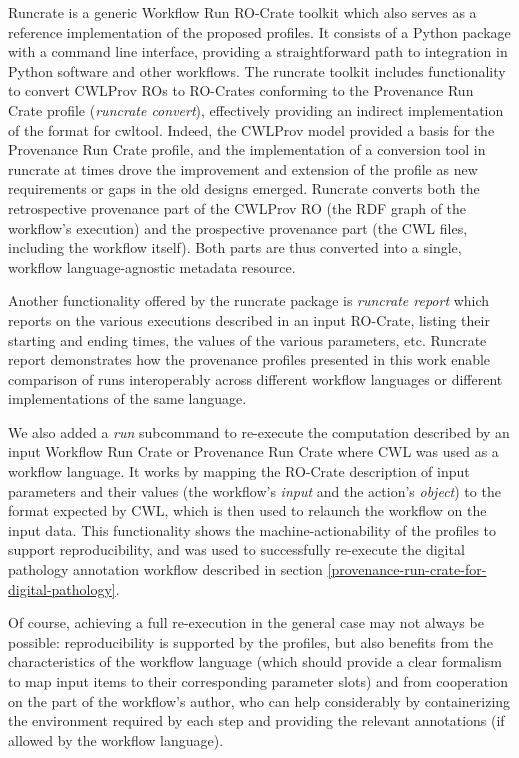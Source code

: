 \documentclass[10pt,letterpaper]{article}
\begin{document}
Runcrate \cite{runcrate} is a generic Workflow Run RO-Crate toolkit which also serves as a reference implementation of the proposed profiles.
It consists of a Python package with a command line interface, providing a straightforward path to integration in Python software and other workflows.
The runcrate toolkit includes functionality to convert CWLProv ROs to RO-Crates conforming to the Provenance Run Crate profile (\emph{runcrate convert}), effectively providing an indirect implementation of the format for cwltool.
Indeed, the CWLProv model provided a basis for the Provenance Run Crate profile, and the implementation of a conversion tool in runcrate at times drove the improvement and extension of the profile as new requirements or gaps in the old designs emerged.
Runcrate converts both the retrospective provenance part of the CWLProv RO (the RDF graph of the workflow's execution) and the prospective provenance part (the CWL files, including the workflow itself).
Both parts are thus converted into a single, workflow language-agnostic metadata resource.

Another functionality offered by the runcrate package is \emph{runcrate report} which reports on the various executions described in an input RO-Crate, listing their starting and ending times, the values of the various parameters, etc.
Runcrate report demonstrates how the provenance profiles presented in this work enable comparison of runs interoperably across different workflow languages or different implementations of the same language.

We also added a \emph{run} subcommand to re-execute the computation described by an input Workflow Run Crate or Provenance Run Crate where CWL was used as a workflow language.
It works by mapping the RO-Crate description of input parameters and their values (the workflow's
\emph{input} and the action's \emph{object}) to the format expected by CWL, which is then used to relaunch the workflow on the input data.
This functionality shows the machine-actionability of the profiles to support reproducibility, and was used to successfully re-execute the digital pathology annotation workflow described in section \ref{provenance-run-crate-for-digital-pathology}.

Of course, achieving a full re-execution in the general case may not always be possible: reproducibility is supported by the profiles, but also benefits from the characteristics of the workflow language (which should provide a clear formalism to map input items to their corresponding parameter slots) and from cooperation on the part of the workflow's author, who can help considerably by containerizing the environment required by each step and providing the relevant annotations (if allowed by the workflow language).
\end{document}
